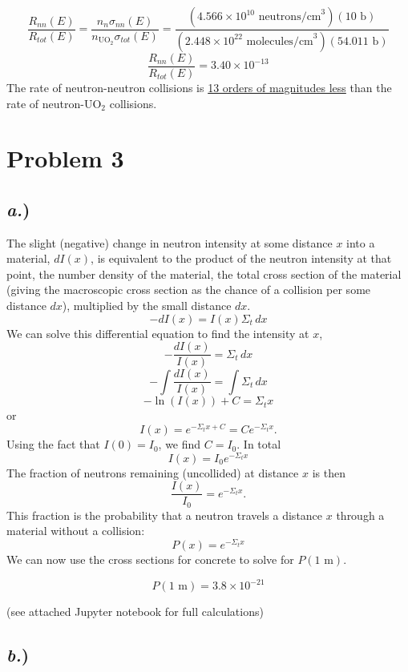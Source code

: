 \documentclass{article}
\begin{document}
$$ \frac{R_{nn}(E)}{R_{tot}(E)} = \frac{n_n \sigma_{nn}(E)}{n_{\text{UO}_2} \sigma_{tot}(E)} = \frac{(4.566\times10^{10}\text{ neutrons/cm}^3)(10\text{ b})}{(2.448\times10^{22}\text{ molecules/cm}^3)(54.011\text{ b})}$$
$$ \frac{R_{nn}(E)}{R_{tot}(E)} = 3.40\times10^{-13} $$
The rate of neutron-neutron collisions is \underline{13 orders of magnitudes less} than the rate of neutron-UO$_2$ collisions.



\newpage

\section*{Problem 3}

\subsection*{\textit{a.})}

The slight (negative) change in neutron intensity at some distance $x$ into a material, $dI(x)$, is equivalent to the product of the neutron intensity at that point, the number density of the material, the total cross section of the material (giving the macroscopic cross section as the chance of a collision per some distance $dx$), multiplied by the small distance $dx$.
$$ -dI(x) = I(x)\Sigma_t \,dx $$
We can solve this differential equation to find the intensity at $x$,
$$ -\frac{dI(x)}{I(x)} = \Sigma_t \, dx $$
$$ -\int\frac{dI(x)}{I(x)} = \int\Sigma_t \, dx $$
$$ - \ln(I(x)) + C= \Sigma_t x $$
or
$$ I(x) = e^{-\Sigma_t x + C} = Ce^{-\Sigma_t x}.$$
Using the fact that $I(0) = I_0$, we find $C=I_0$. In total
$$ I(x) = I_0 e^{-\Sigma_t x} $$
The fraction of neutrons remaining (uncollided) at distance $x$ is then
$$ \frac{I(x)}{I_0} = e^{-\Sigma_t x} .$$
This fraction is the probability that a neutron travels a distance $x$ through a material without a collision:
$$ P(x) = e^{-\Sigma_t x} $$
We can now use the cross sections for concrete to solve for $P(1\text{ m})$.

$$\boxed{ P(1\text{ m}) = 3.8\times10^{-21} }$$

(see attached Jupyter notebook for full calculations)

\subsection*{\textit{b.})}
\end{document}
